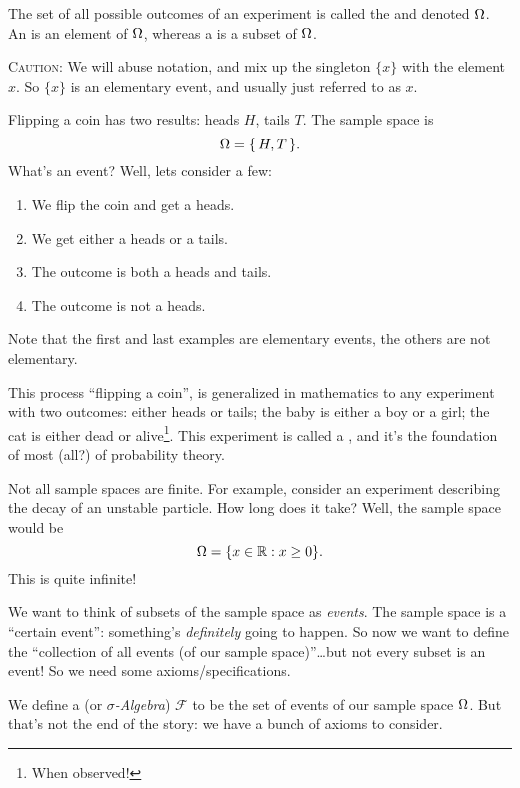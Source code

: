 The set of all possible outcomes of an experiment is
called the  and denoted
$\Omega$. An  is an element of
$\Omega$, whereas a  is a subset of $\Omega$.

\textsc{Caution:} We will abuse notation, and mix up the singleton
$\{x\}$ with the element $x$. So $\{x\}$ is an elementary event, and
usually just referred to as $x$.

 Flipping a coin has two results: heads $H$, tails $T$. The
sample space is
\begin{equation}
\Omega = \{\,H,T\,\}.
\end{equation}
What's an event? Well, lets consider a few:
\begin{enumerate}
\item We flip the coin and get a heads.
\item We get either a heads or a tails.
\item The outcome is both a heads and tails.
\item The outcome is not a heads.
\end{enumerate}
Note that the first and last examples are elementary events, the others
are not elementary.

This process ``flipping a coin'', is generalized in mathematics to any
experiment with two outcomes: either heads or tails; the baby is either
a boy or a girl; the cat is either dead or alive\footnote{When
  observed!}. This experiment is called a , and
it's the foundation of most (all?) of probability theory.

Not all sample spaces are finite. For example, consider an experiment
describing the decay of an unstable particle. How long does it take?
Well, the sample space would be
\begin{equation}
\Omega = \{x\in\mathbb{R} : x\geq0\}.
\end{equation}
This is quite infinite!

We want to think of subsets of the sample space as \emph{events}. The
sample space is a ``certain event'': something's \emph{definitely} going
to happen. So now we want to define the ``collection of all events (of
our sample space)''\dots{}but not every subset is an event! So we need
some axioms/specifications.

We define a  (or \emph{$\sigma$-Algebra})
$\mathcal{F}$ to be the set of events of our sample space
$\Omega$. But that's not the end of the  story: we have a bunch of
axioms to consider. 

